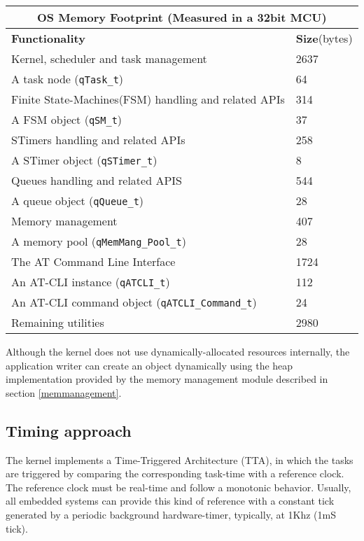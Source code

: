 \begin{center}
\begin{tabular}{ |p{10cm}||p{1.5cm}|  }
    \hline
    \multicolumn{2}{|c|}{ \textbf{OS Memory Footprint} \scriptsize{(Measured in a 32bit MCU)}} \\
    \hline
    \textbf{Functionality} & \textbf{Size}\scriptsize{(bytes)}\\
    \hline
    Kernel, scheduler and task management& 2637\\
    A task node ({\lstinline!qTask_t!}) & 64\\
    Finite State-Machines(FSM) handling and related APIs& 314\\
    A FSM object ({\lstinline!qSM_t!}) & 37 \\
    STimers handling and related APIs & 258\\
    A STimer object ({\lstinline!qSTimer_t!})& 8\\
    Queues handling and related APIS & 544\\
    A queue object ({\lstinline!qQueue_t!}) & 28\\
    Memory management & 407\\
    A memory pool ({\lstinline!qMemMang_Pool_t!}) & 28 \\ 
    The AT Command Line Interface & 1724\\
    An AT-CLI instance ({\lstinline!qATCLI_t!})& 112\\
    An AT-CLI command object ({\lstinline!qATCLI_Command_t!})& 24\\
    Remaining utilities& 2980\\
    \hline
\end{tabular}
\end{center}

 \begin{tcolorbox}
 \HandRight Although the kernel does not use dynamically-allocated resources internally, the application writer can create an object dynamically using the heap implementation provided by the memory management module described in section \ref{memmanagement}.
 \end{tcolorbox}

\subsection{Timing approach}
The kernel implements a Time-Triggered Architecture (TTA)\cite{pont}, in which the tasks are triggered by comparing the corresponding task-time with a reference clock. The reference clock must be real-time and follow a monotonic behavior. Usually, all embedded systems can provide this kind of reference with a constant tick generated by a periodic background hardware-timer, typically, at 1Khz (1mS tick). 

